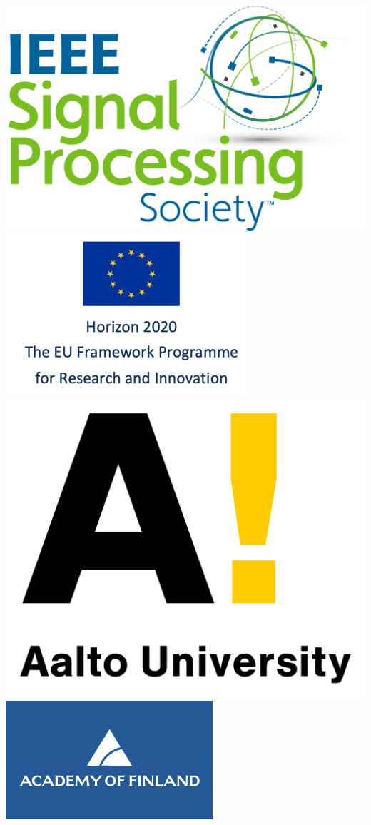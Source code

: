 \documentclass[12pt,epsf]{article}
\begin{document}
\begin{framed}
\vspace*{10mm}
\includegraphics[height=0.07\paperheight]{SPS_Logo_Color_RGB}
\hspace*{10mm}
\includegraphics[height=0.07\paperheight]{horizon2020}
\hspace*{10mm}
\includegraphics[height=0.07\paperheight]{aaltologo}
\hspace*{10mm}
\includegraphics[height=0.07\paperheight]{AoFLogo}
\vspace*{2mm}




\end{framed}
\end{document}
